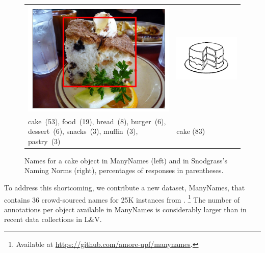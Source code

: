 \begin{figure}[tbp]
\scriptsize
\begin{tabular}{p{4.3cm}p{2cm}}
\centering
\includegraphics[scale=0.15]{figures/2390077_1254219_supercat_unique.png} &
\includegraphics[scale=0.4]{figures/snodgrass_vanderwart_cake_042.png}\\
 cake\ (53),  food\ (19), bread\ (8), burger\ (6), dessert\ (6), snacks\ (3), muffin\ (3),  pastry\ (3) & \hspace{.9cm} cake (83)
\end{tabular}
\caption{Names for a cake object in ManyNames (left) and in Snodgrass's Naming Norms (right), percentages of responses in parentheses.}
\label{fig:cake}
\end{figure}

To address this shortcoming, we contribute a new dataset, ManyNames, that contains 36 crowd-sourced names for 25K instances from \vgenome.%
\footnote{Available at \url{https://github.com/amore-upf/manynames}.}
The number of annotations per object available in ManyNames is considerably larger than in recent data collections in L\&V.

